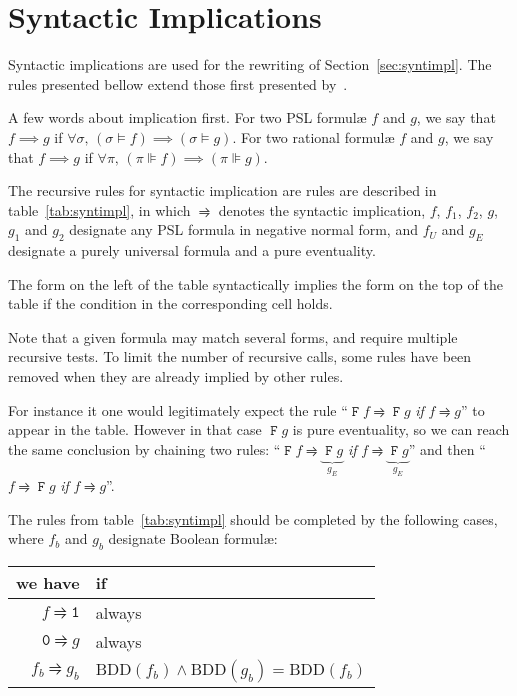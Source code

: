 \documentclass[a4paper,twoside,10pt,DIV=12,draft]{scrreprt}
\DeclareMathOperator{\F}{\texttt{F}}
\newcommand{\0}{\texttt{0}}
\newcommand{\1}{\texttt{1}}
\def\simp{\rightrightharpoons}
\begin{document}
\appendix
\chapter{Syntactic Implications}\label{ann:syntimpl}

Syntactic implications are used for the rewriting of
Section~\ref{sec:syntimpl}.  The rules presented bellow extend those
first presented by~\citet{somenzi.00.cav}.

A few words about implication first.  For two PSL formul\ae{} $f$ and
$g$, we say that $f\implies g$ if $\forall\sigma,\,(\sigma\vDash
f)\implies(\sigma\vDash g)$.  For two rational formul\ae{} $f$ and
$g$, we say that $f\implies g$ if $\forall\pi,\,(\pi\VDash
f)\implies(\pi\VDash g)$.

The recursive rules for syntactic implication are rules are described
in table~\ref{tab:syntimpl}, in which $\simp$ denotes the syntactic
implication, $f$, $f_1$, $f_2$, $g$, $g_1$ and $g_2$ designate any PSL
formula in negative normal form, and $f_U$ and $g_E$ designate a
purely universal formula and a pure eventuality.

The form on the left of the table syntactically implies the form on
the top of the table if the condition in the corresponding cell holds.

Note that a given formula may match several forms, and require
multiple recursive tests.  To limit the number of recursive calls,
some rules have been removed when they are already implied by other
rules.

For instance it one would legitimately expect the rule ``$\F f \simp
\F g$ \textit{if} $f\simp g$'' to appear in the table.  However in
that case $\F g$ is pure eventuality, so we can reach the same
conclusion by chaining two rules: ``$\F f \simp \underbrace{\F
  g}_{g_E}$ \textit{if} $f\simp \underbrace{\F g}_{g_E}$'' and then
``$f \simp \F g$ \textit{if} $f\simp g$''.

The rules from table~\ref{tab:syntimpl} should be completed by the
following cases, where $f_b$ and $g_b$ designate Boolean formul\ae{}:
\begin{center}
\begin{tabular}{rl}
we have                       & if                                    \\
\hline
$f\simp \1$                   & always                                \\
$\0\simp g$                   & always                                \\
$f_b \simp g_b$               & $\mathrm{BDD}(f_b)\land \mathrm{BDD}(g_b) =
                                \mathrm{BDD}(f_b)$                    \\
\end{tabular}
\end{center}
\end{document}
